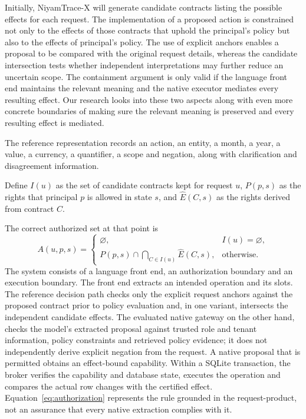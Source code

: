 \documentclass[pdflatex,sn-nature]{sn-jnl}
\begin{document}
Initially, NiyamTrace-X will generate candidate contracts listing the possible effects for each request. The implementation of a proposed action is constrained not only to the effects of those contracts that uphold the principal's policy but also to the effects of principal's policy. The use of explicit anchors enables a proposal to be compared with the original request details, whereas the candidate intersection tests whether independent interpretations may further reduce an uncertain scope. The containment argument is only valid if the language front end maintains the relevant meaning and the native executor mediates every resulting effect. Our research looks into these two aspects along with even more concrete boundaries of making sure the relevant meaning is preserved and every resulting effect is mediated.


The reference representation records an action, an entity, a month, a year, a value, a currency, a quantifier, a scope and negation, along with clarification and disagreement information.

Define $I(u)$ as the set of candidate contracts kept for request $u$, $P(p,s)$ as the rights that principal $p$ is allowed in state $s$, and $\widehat{E}(C,s)$ as the rights derived from contract $C$.

The correct authorized set at that point is
\begin{equation}
A(u,p,s)=
\begin{cases}
\varnothing, & I(u)=\varnothing,\\
P(p,s)\cap\displaystyle\bigcap_{C\in I(u)}
\widehat{E}(C,s), & \text{otherwise}.
\end{cases}
\label{eq:authorization}
\end{equation}
The system consists of a language front end, an authorization boundary and an execution boundary. The front end extracts an intended operation and its slots. The reference decision path checks only the explicit request anchors against the proposed contract prior to policy evaluation and, in one variant, intersects the independent candidate effects. The evaluated native gateway on the other hand, checks the model's extracted proposal against trusted role and tenant information, policy constraints and retrieved policy evidence; it does not independently derive explicit negation from the request. A native proposal that is permitted obtains an effect-bound capability. Within a SQLite transaction, the broker verifies the capability and database state, executes the operation and compares the actual row changes with the certified effect. Equation~\ref{eq:authorization} represents the rule grounded in the request-product, not an assurance that every native extraction complies with it.
\end{document}
